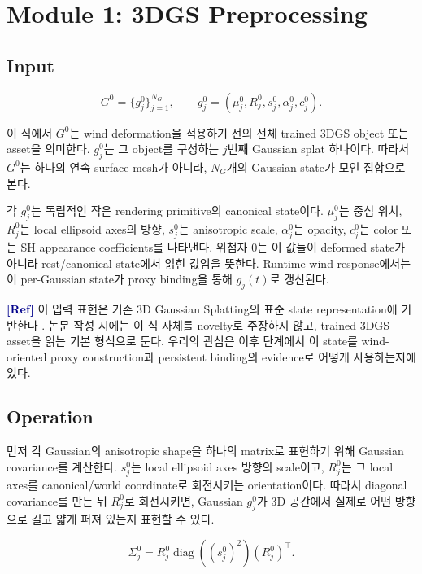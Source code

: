 \documentclass[11pt,a4paper]{article}
\newcommand{\refbased}{\textcolor{darkblue}{\textbf{[Ref]}}}
\begin{document}
\section{Module 1: 3DGS Preprocessing}

\subsection*{Input}

\begin{equation}
G^0=\{g_j^0\}_{j=1}^{N_G},\qquad
g_j^0=(\mu_j^0,R_j^0,s_j^0,\alpha_j^0,c_j^0).
\end{equation}

이 식에서 $G^0$는 wind deformation을 적용하기 전의 전체 trained 3DGS object 또는 asset을 의미한다.
$g_j^0$는 그 object를 구성하는 $j$번째 Gaussian splat 하나이다.
따라서 $G^0$는 하나의 연속 surface mesh가 아니라, $N_G$개의 Gaussian state가 모인 집합으로 본다.

각 $g_j^0$는 독립적인 작은 rendering primitive의 canonical state이다.
$\mu_j^0$는 중심 위치, $R_j^0$는 local ellipsoid axes의 방향, $s_j^0$는 anisotropic scale, $\alpha_j^0$는 opacity, $c_j^0$는 color 또는 SH appearance coefficients를 나타낸다.
위첨자 $0$는 이 값들이 deformed state가 아니라 rest/canonical state에서 읽힌 값임을 뜻한다.
Runtime wind response에서는 이 per-Gaussian state가 proxy binding을 통해 $g_j(t)$로 갱신된다.

\noindent\refbased\;
이 입력 표현은 기존 3D Gaussian Splatting의 표준 state representation에 기반한다 \cite{kerbl2023gaussian}.
논문 작성 시에는 이 식 자체를 novelty로 주장하지 않고, trained 3DGS asset을 읽는 기본 형식으로 둔다.
우리의 관심은 이후 단계에서 이 state를 wind-oriented proxy construction과 persistent binding의 evidence로 어떻게 사용하는지에 있다.

\subsection*{Operation}

먼저 각 Gaussian의 anisotropic shape을 하나의 matrix로 표현하기 위해 Gaussian covariance를 계산한다.
$s_j^0$는 local ellipsoid axes 방향의 scale이고, $R_j^0$는 그 local axes를 canonical/world coordinate로 회전시키는 orientation이다.
따라서 diagonal covariance를 만든 뒤 $R_j^0$로 회전시키면, Gaussian $g_j^0$가 3D 공간에서 실제로 어떤 방향으로 길고 얇게 퍼져 있는지 표현할 수 있다.

\begin{equation}
\Sigma_j^0 = R_j^0\operatorname{diag}((s_j^0)^2)(R_j^0)^\top.
\end{equation}
\end{document}
